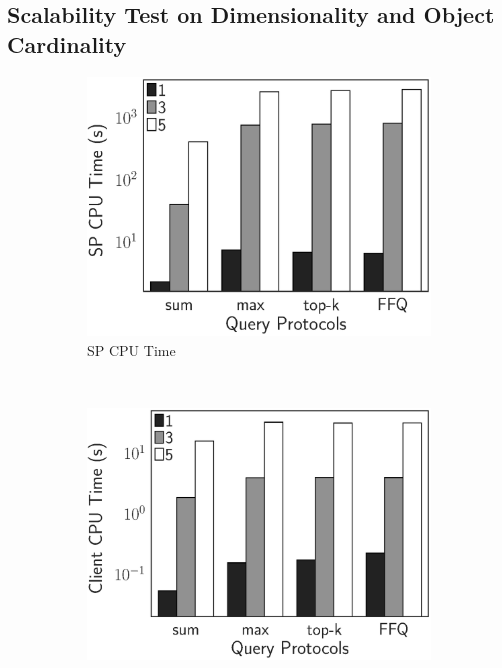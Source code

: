 \subsection{Scalability Test on Dimensionality and Object Cardinality}


\begin{figure}[t]
  \centering
  \begin{subfigure}[b]{.33\linewidth}
    \centering
    \includegraphics[height=\ht\figbox]{exp-figs/aggregate-queries/dimension_sp.eps}
    \caption{SP CPU Time}
  \end{subfigure}~%
  \begin{subfigure}[b]{.33\linewidth}
    \centering
    \includegraphics[height=\ht\figbox]{exp-figs/aggregate-queries/dimension_client.eps}

\end{subfigure}
\end{figure}
